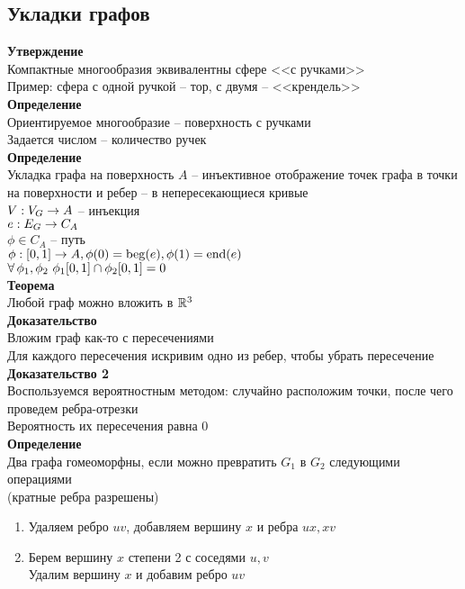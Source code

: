 \documentclass[12pt]{article}
\begin{document}
\subsection{Укладки графов}
\textbf{Утверждение}\\
Компактные многообразия эквивалентны сфере <<с ручками>>\\
Пример: сфера с одной ручкой -- тор, с двумя -- <<крендель>>\\
\textbf{Определение}\\
Ориентируемое многообразие -- поверхность с ручками\\
Задается числом -- количество ручек\\
\textbf{Определение}\\
Укладка графа на поверхность $A$ -- инъективное отображение точек графа в точки на поверхности и ребер -- в непересекающиеся кривые\\
$V: V_G \rightarrow A$ -- инъекция\\
$e: E_G \rightarrow C_A$\\
$\phi \in C_A$ -- путь\\
$\phi : [0,1] \rightarrow A,\phi(0)=\operatorname{beg}(e), \phi(1)=\operatorname{end}(e)$\\
$\forall\, \phi_1, \phi_2\ \phi_1[0,1]\cap \phi_2[0,1] = 0$\\
\textbf{Теорема}\\
Любой граф можно вложить в $\mathbb{R}^3$\\
\textbf{Доказательство}\\
Вложим граф как-то с пересечениями\\
Для каждого пересечения искривим одно из ребер, чтобы убрать пересечение\\
\textbf{Доказательство 2}\\
Воспользуемся вероятностным методом: случайно расположим точки, после чего проведем ребра-отрезки\\
Вероятность их пересечения равна 0\\
\textbf{Определение}\\
Два графа гомеоморфны, если можно превратить $G_1$ в $G_2$ следующими операциями\\
(кратные ребра разрешены)
\begin{enumerate}
    \item Удаляем ребро $uv$, добавляем вершину $x$ и ребра $ux, xv$
    \item Берем вершину $x$ степени 2 с соседями $u, v$\\
    Удалим вершину $x$ и добавим ребро $uv$
\end{enumerate}
\end{document}
